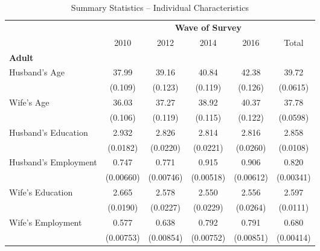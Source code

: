 \documentclass[12pt]{extarticle}
\begin{document}
\begin{table}
\fontsize{10}{11}\selectfont
\centering
\caption{Summary Statistics -- Individual Characteristics} \label{tab:sumstats2}
\begin{threeparttable}
\begin{tabular}{l*{5}{c}}
\hline\hline
                    &\multicolumn{5}{c}{\textbf{Wave of Survey}}                                         \\
\cline{2-6}
                    &        2010&        2012&        2014&        2016&       Total\\
\hline
\textbf{Adult} \\
Husband's Age       &       37.99&       39.16&       40.84&       42.38&       39.72\\
                    &     (0.109)&     (0.123)&     (0.119)&     (0.126)&    (0.0615)\\
[1em]
Wife's Age          &       36.03&       37.27&       38.92&       40.37&       37.78\\
                    &     (0.106)&     (0.119)&     (0.115)&     (0.122)&    (0.0598)\\
[1em]
Husband's Education &       2.932&       2.826&       2.814&       2.816&       2.858\\
                    &    (0.0182)&    (0.0220)&    (0.0221)&    (0.0260)&    (0.0108)\\
[1em]
Husband's Employment&       0.747&       0.771&       0.915&       0.906&       0.820\\
                    &   (0.00660)&   (0.00746)&   (0.00518)&   (0.00612)&   (0.00341)\\
[1em]
Wife's Education    &       2.665&       2.578&       2.550&       2.556&       2.597\\
                    &    (0.0190)&    (0.0227)&    (0.0229)&    (0.0264)&    (0.0111)\\
[1em]
Wife's Employment   &       0.577&       0.638&       0.792&       0.791&       0.680\\
                    &   (0.00753)&   (0.00854)&   (0.00752)&   (0.00851)&   (0.00414)\\
\hline


\end{tabular}
\end{threeparttable}
\end{table}
\end{document}
